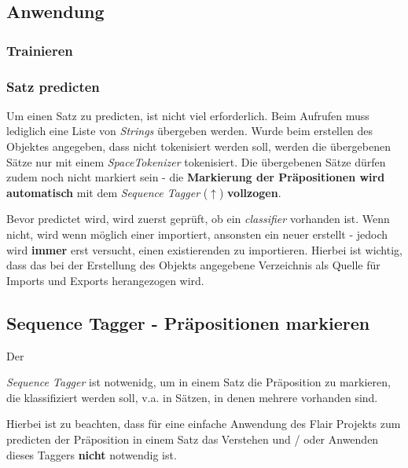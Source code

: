 \documentclass[10pt,a4paper]{article}
\begin{document}
\subsection{Anwendung}
\begin{flushleft}

\end{flushleft}

\subsubsection{Trainieren}
\begin{flushleft}

\end{flushleft}

\subsubsection{Satz predicten}
\begin{flushleft}
Um einen Satz zu predicten, ist nicht viel erforderlich. Beim Aufrufen muss lediglich eine Liste von \textit{Strings} übergeben werden. Wurde beim erstellen des Objektes angegeben, dass nicht tokenisiert werden soll, werden die übergebenen Sätze nur mit einem \textit{SpaceTokenizer} tokenisiert. Die übergebenen Sätze dürfen zudem noch nicht markiert sein - die \textbf{Markierung der Präpositionen wird automatisch} mit dem \textit{Sequence Tagger} (\hyperlink{SeqTag}{$\uparrow$}) \textbf{vollzogen}.

Bevor predictet wird, wird zuerst geprüft, ob ein \textit{classifier} vorhanden ist. Wenn nicht, wird wenn möglich einer importiert, ansonsten ein neuer erstellt - jedoch wird \textbf{immer} erst versucht, einen existierenden zu importieren. Hierbei ist wichtig, dass das bei der Erstellung des Objekts angegebene Verzeichnis als Quelle für Imports und Exports herangezogen wird. 
\end{flushleft}

\subsection{Sequence Tagger - Präpositionen markieren}
\begin{flushleft}
\hypertarget{SeqTag}{Der} \textit{Sequence Tagger} ist notwenidg, um in einem Satz die Präposition zu markieren, die klassifiziert werden soll, v.a. in Sätzen, in denen mehrere vorhanden sind.

Hierbei ist zu beachten, dass für eine einfache Anwendung des Flair Projekts zum predicten der Präposition in einem Satz das Verstehen und / oder Anwenden dieses Taggers \textbf{nicht} notwendig ist.
\end{flushleft}
\end{document}

